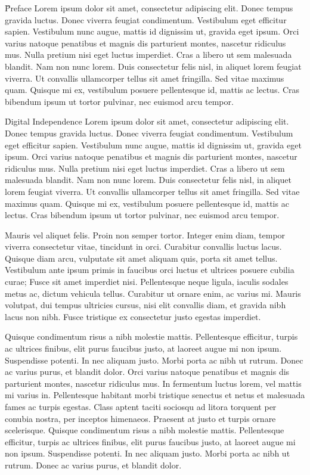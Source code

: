 \documentclass[onecolumn]{tome}
\begin{document}
\frontpage

\toc

\H{Preface}
Lorem ipsum dolor sit amet, consectetur adipiscing elit. Donec tempus gravida luctus. Donec viverra feugiat condimentum. Vestibulum eget efficitur sapien. Vestibulum nunc augue, mattis id dignissim ut, gravida eget ipsum. Orci varius natoque penatibus et magnis dis parturient montes, nascetur ridiculus mus. Nulla pretium nisi eget luctus imperdiet. Cras a libero ut sem malesuada blandit. Nam non nunc lorem. Duis consectetur felis nisl, in aliquet lorem feugiat viverra. Ut convallis ullamcorper tellus sit amet fringilla. Sed vitae maximus quam. Quisque mi ex, vestibulum posuere pellentesque id, mattis ac lectus. Cras bibendum ipsum ut tortor pulvinar, nec euismod arcu tempor.

\h{Digital Independence}
Lorem ipsum dolor sit amet, consectetur adipiscing elit. Donec tempus gravida luctus. Donec viverra feugiat condimentum. Vestibulum eget efficitur sapien. Vestibulum nunc augue, mattis id dignissim ut, gravida eget ipsum. Orci varius natoque penatibus et magnis dis parturient montes, nascetur ridiculus mus. Nulla pretium nisi eget luctus imperdiet. Cras a libero ut sem malesuada blandit. Nam non nunc lorem. Duis consectetur felis nisl, in aliquet lorem feugiat viverra. Ut convallis ullamcorper tellus sit amet fringilla. Sed vitae maximus quam. Quisque mi ex, vestibulum posuere pellentesque id, mattis ac lectus. Cras bibendum ipsum ut tortor pulvinar, nec euismod arcu tempor.

Mauris vel aliquet felis. Proin non semper tortor. Integer enim diam, tempor viverra consectetur vitae, tincidunt in orci. Curabitur convallis luctus lacus. Quisque diam arcu, vulputate sit amet aliquam quis, porta sit amet tellus. Vestibulum ante ipsum primis in faucibus orci luctus et ultrices posuere cubilia curae; Fusce sit amet imperdiet nisi. Pellentesque neque ligula, iaculis sodales metus ac, dictum vehicula tellus. Curabitur ut ornare enim, ac varius mi. Mauris volutpat, dui tempus ultricies cursus, nisi elit convallis diam, et gravida nibh lacus non nibh. Fusce tristique ex consectetur justo egestas imperdiet.

Quisque condimentum risus a nibh molestie mattis. Pellentesque efficitur, turpis ac ultrices finibus, elit purus faucibus justo, at laoreet augue mi non ipsum. Suspendisse potenti. In nec aliquam justo. Morbi porta ac nibh ut rutrum. Donec ac varius purus, et blandit dolor. Orci varius natoque penatibus et magnis dis parturient montes, nascetur ridiculus mus. In fermentum luctus lorem, vel mattis mi varius in. Pellentesque habitant morbi tristique senectus et netus et malesuada fames ac turpis egestas. Class aptent taciti sociosqu ad litora torquent per conubia nostra, per inceptos himenaeos. Praesent at justo et turpis ornare scelerisque. Quisque condimentum risus a nibh molestie mattis. Pellentesque efficitur, turpis ac ultrices finibus, elit purus faucibus justo, at laoreet augue mi non ipsum. Suspendisse potenti. In nec aliquam justo. Morbi porta ac nibh ut rutrum. Donec ac varius purus, et blandit dolor.
\end{document}
